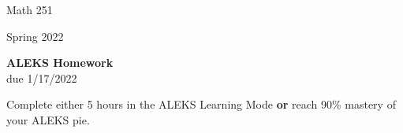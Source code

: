 \documentclass[11pt]{report}
\theoremstyle{plain}
\begin{document}
\hfill Math 251

\hfill Spring 2022

\begin{center}
\Large{\textbf{ALEKS Homework}} \\
due 1/17/2022
\end{center}
Complete either 5 hours in the ALEKS Learning Mode \textbf{or} reach 90\% mastery of your ALEKS pie.
\end{document}
